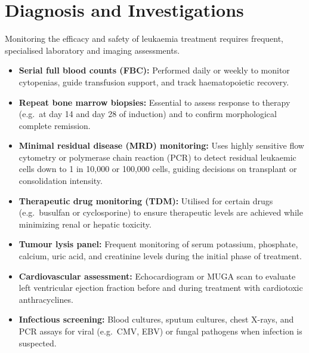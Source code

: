 \section*{Diagnosis and Investigations}
Monitoring the efficacy and safety of leukaemia treatment requires frequent, specialised laboratory and imaging assessments.
\begin{itemize}
    \item \textbf{Serial full blood counts (FBC):} Performed daily or weekly to monitor cytopenias, guide transfusion support, and track haematopoietic recovery.
    \item \textbf{Repeat bone marrow biopsies:} Essential to assess response to therapy (e.g.\ at day 14 and day 28 of induction) and to confirm morphological complete remission.
    \item \textbf{Minimal residual disease (MRD) monitoring:} Uses highly sensitive flow cytometry or polymerase chain reaction (PCR) to detect residual leukaemic cells down to 1 in 10,000 or 100,000 cells, guiding decisions on transplant or consolidation intensity.
    \item \textbf{Therapeutic drug monitoring (TDM):} Utilised for certain drugs (e.g.\ busulfan or cyclosporine) to ensure therapeutic levels are achieved while minimizing renal or hepatic toxicity.
    \item \textbf{Tumour lysis panel:} Frequent monitoring of serum potassium, phosphate, calcium, uric acid, and creatinine levels during the initial phase of treatment.
    \item \textbf{Cardiovascular assessment:} Echocardiogram or MUGA scan to evaluate left ventricular ejection fraction before and during treatment with cardiotoxic anthracyclines.
    \item \textbf{Infectious screening:} Blood cultures, sputum cultures, chest X-rays, and PCR assays for viral (e.g.\ CMV, EBV) or fungal pathogens when infection is suspected.
\end{itemize}

